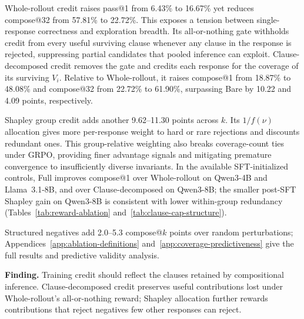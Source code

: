 Whole-rollout credit raises pass@1 from 6.43\% to 16.67\% yet reduces
compose@32 from 57.81\% to 22.72\%.  This exposes a tension between
single-response correctness and exploration breadth.  Its all-or-nothing
gate withholds credit from every useful surviving clause whenever any clause
in the response is rejected, suppressing partial candidates that pooled
inference can exploit.  Clause-decomposed credit removes the gate and credits
each response for the coverage of its surviving \(V_i\).  Relative to
Whole-rollout, it raises compose@1 from 18.87\% to 48.08\% and compose@32 from
22.72\% to 61.90\%, surpassing Bare by 10.22 and 4.09 points, respectively.

Shapley group credit adds another 9.62--11.30 points across \(k\).  Its
\(1/f(\nu)\) allocation gives more per-response weight to hard or rare
rejections and discounts redundant ones.  This group-relative weighting also
breaks coverage-count ties under GRPO, providing finer advantage signals and
mitigating premature convergence to insufficiently diverse invariants.
In the available SFT-initialized controls, Full improves compose@1 over
Whole-rollout on Qwen3-4B and Llama~3.1-8B, and over Clause-decomposed on
Qwen3-8B; the smaller post-SFT Shapley gain on Qwen3-8B is consistent with lower
within-group redundancy (Tables~\ref{tab:reward-ablation}
and~\ref{tab:clause-cap-structure}).

Structured negatives add 2.0--5.3 compose@\(k\) points over random
perturbations; Appendices~\ref{app:ablation-definitions}
and~\ref{app:coverage-predictiveness} give the full results and predictive
validity analysis.

\begin{insightbox}
\textbf{Finding.}
Training credit should reflect the clauses retained by compositional
inference.  Clause-decomposed credit preserves useful contributions lost
under Whole-rollout's all-or-nothing reward; Shapley allocation further
rewards contributions that reject negatives few other responses can reject.
\end{insightbox}
